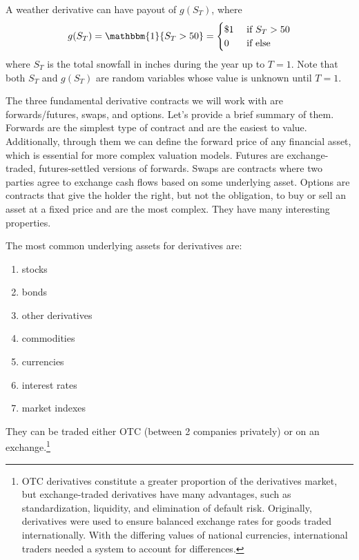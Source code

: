 \documentclass{article}
\begin{document}
  \begin{example}
    \label{ex:weather-derivatives}
    A weather derivative can have payout of $g(S_T)$, where 
    \begin{equation}
      g(S_T) = \mathbbm{1} \{S_T > 50\} = \begin{cases} \$1 & \text{ if } S_T > 50 \\ 0 & \text{ if else} \end{cases}
    \end{equation}
    where $S_T$ is the total snowfall in inches during the year up to $T = 1$. Note that both $S_T$ and $g(S_T)$ are random variables whose value is unknown until $T = 1$.
  \end{example}

  The three fundamental derivative contracts we will work with are forwards/futures, swaps, and options. Let's provide a brief summary of them. Forwards are the simplest type of contract and are the easiest to value. Additionally, through them we can define the forward price of any financial asset, which is essential for more complex valuation models. Futures are exchange-traded, futures-settled versions of forwards. Swaps are contracts where two parties agree to exchange cash flows based on some underlying asset. Options are contracts that give the holder the right, but not the obligation, to buy or sell an asset at a fixed price and are the most complex. They have many interesting properties. 

  The most common underlying assets for derivatives are: 
  \begin{enumerate}
    \item stocks
    \item bonds
    \item other derivatives 
    \item commodities
    \item currencies
    \item interest rates 
    \item market indexes 
  \end{enumerate}
  They can be traded either OTC (between 2 companies privately) or on an exchange.\footnote{OTC derivatives constitute a greater proportion of the derivatives market, but exchange-traded derivatives have many advantages, such as standardization, liquidity, and elimination of default risk. Originally, derivatives were used to ensure balanced exchange rates for goods traded internationally. With the differing values of national currencies, international traders needed a system to account for differences. }
\end{document}
